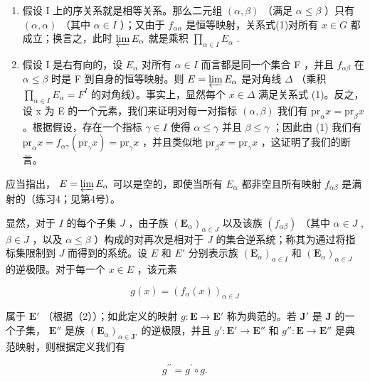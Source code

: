 \begin{enumerate}
\def\labelenumi{(\arabic{enumi})}
\item
  假设 I 上的序关系就是相等关系。那么二元组 \((\alpha, \beta)\) （满足 \(\alpha \leqslant \beta\) ）只有 \((\alpha, \alpha)\) （其中 \(\alpha \in I\) ）；又由于 \(f_{\alpha \alpha}\) 是恒等映射，关系式(1)对所有 \(x \in G\) 都成立；换言之，此时 \(\varprojlim E_{\alpha}\) 就是乘积 \(\prod_{\alpha \in I} E_{\alpha}\) .
\item
  假设 I 是右有向的，设 \(E_{\alpha}\) 对所有 \(\alpha \in I\) 而言都是同一个集合 F ，并且 \(f_{\alpha\beta}\) 在 \(\alpha \leqslant \beta\) 时是 F 到自身的恒等映射。则 \(E = \varprojlim E_{\alpha}\) 是对角线 \(\Delta\) （乘积 \(\prod_{\alpha \in I} E_{\alpha} = F^{I}\) 的对角线）。事实上，显然每个 \(x \in \Delta\) 满足关系式 (1)。反之，设 x 为 E 的一个元素，我们来证明对每一对指标 \((\alpha, \beta)\) 我们有 \(\mathrm{pr}_{\alpha}x = \mathrm{pr}_{\beta}x\) 。根据假设，存在一个指标 \(\gamma \in I\) 使得 \(\alpha \leqslant \gamma\) 并且 \(\beta \leqslant \gamma\) ；因此由 (1) 我们有 \(\mathrm{pr}_{\alpha}x = f_{\alpha \gamma}(\mathrm{pr}_{\gamma}x) = \mathrm{pr}_{\gamma}x\) ，并且类似地 \(\mathrm{pr}_{\beta}x = \mathrm{pr}_{\gamma}x\) ，这证明了我们的断言。
\end{enumerate}

应当指出， \(E = \varprojlim E_{\alpha}\) 可以是空的，即使当所有 \(E_{\alpha}\) 都非空且所有映射 \(f_{\alpha\beta}\) 是满射的（练习4；见第4号）。

显然，对于 \(I\) 的每个子集 \(J\) ，由子族 \((\mathbf{E}_{\alpha})_{\alpha \in J}\) 以及该族 \((f_{\alpha \beta})\) （其中 \(\alpha \in J\) , \(\beta \in J\) ，以及 \(\alpha \leqslant \beta\) ）构成的对再次是相对于 \(J\) 的集合逆系统；称其为通过将指标集限制到 \(J\) 而得到的系统。设 \(E\) 和 \(E'\) 分别表示族 \((\mathbf{E}_{\alpha})_{\alpha \in I}\) 和 \((\mathbf{E}_{\alpha})_{\alpha \in J}\) 的逆极限。对于每一个 \(x \in E\) ，该元素

\[
g (x) = \left(f _ {\alpha} (x)\right) _ {\alpha \in J}\tag{3}
\]

属于 \(\mathbf{E}'\) （根据（2））；如此定义的映射 \(g: \mathbf{E} \to \mathbf{E}'\) 称为典范的。若 \(\mathbf{J}'\) 是 \(\mathbf{J}\) 的一个子集， \(\mathbf{E}''\) 是族 \((\mathbf{E}_{\alpha})_{\alpha \in \mathbf{J}'}\) 的逆极限，并且 \(g': \mathbf{E}' \to \mathbf{E}''\) 和 \(g'': \mathbf{E} \to \mathbf{E}''\) 是典范映射，则根据定义我们有

\[
g ^ {\prime \prime} = g ^ {\prime} \circ g.\tag{4}
\]

